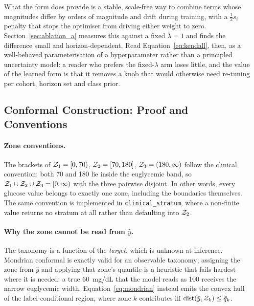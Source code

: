 What the form does provide is a stable, scale-free way to combine terms whose
magnitudes differ by orders of magnitude and drift during training, with a
$\tfrac{1}{2} s_i$ penalty that stops the optimiser from driving either weight
to zero. Section~\ref{sec:ablation_a} measures this against a fixed
$\lambda = 1$ and finds the difference small and horizon-dependent. Read
Equation~\ref{eq:kendall}, then, as a well-behaved parameterisation of a
hyperparameter rather than a principled uncertainty model: a reader who prefers
the fixed-$\lambda$ arm loses little, and the value of the learned form is that
it removes a knob that would otherwise need re-tuning per cohort, horizon set
and class prior.

\subsection{Conformal Construction: Proof and Conventions}
\label{sec:appendix_conformal_method}

\paragraph{Zone conventions.} The brackets of
$\mathcal{Z}_{1} = [0, 70)$, $\mathcal{Z}_{2} = [70, 180]$, $\mathcal{Z}_{3} = (180, \infty)$ follow
the clinical convention: both 70 and 180 lie inside the euglycemic band, so
$\mathcal{Z}_{1} \cup \mathcal{Z}_{2} \cup \mathcal{Z}_{3} = [0, \infty)$ with the three pairwise
disjoint. In other words, every glucose value belongs to exactly one zone,
including the boundaries themselves. The same convention is implemented in
\texttt{clinical\_stratum}, where a non-finite value returns no stratum at all
rather than defaulting into $\mathcal{Z}_{2}$.

\paragraph{Why the zone cannot be read from $\hat{y}$.} The taxonomy is a
function of the \emph{target}, which is unknown at inference. Mondrian conformal
is exactly valid for an observable taxonomy; assigning the zone from $\hat{y}$
and applying that zone's quantile is a heuristic that fails hardest where it is
needed: a true 60~mg/dL that the model reads as 100 receives the narrow
euglycemic width. Equation~\ref{eq:mondrian} instead emits the convex hull of the
label-conditional region, where zone $k$ contributes iff
$\operatorname{dist}(\hat{y}, \mathcal{Z}_{k}) \le \hat{q}_k$.

